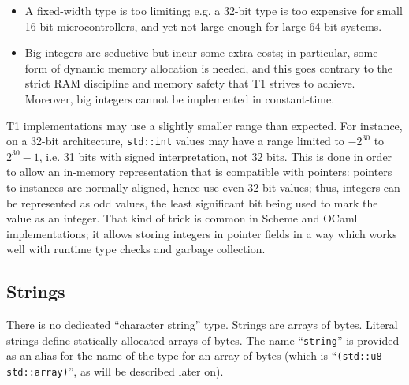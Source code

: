\begin{rationale}
\begin{itemize}
    \item A fixed-width type is too limiting; e.g. a 32-bit type is
    too expensive for small 16-bit microcontrollers, and yet not large
    enough for large 64-bit systems.

    \item Big integers are seductive but incur some extra costs; in
    particular, some form of dynamic memory allocation is needed, and
    this goes contrary to the strict RAM discipline and memory safety
    that T1 strives to achieve. Moreover, big integers cannot be
    implemented in constant-time.

\end{itemize}

T1 implementations may use a slightly smaller range than expected. For
instance, on a 32-bit architecture, \verb|std::int| values may have a
range limited to $-2^{30}$ to $2^{30}-1$, i.e. 31 bits with signed
interpretation, not 32 bits. This is done in order to allow an in-memory
representation that is compatible with pointers: pointers to instances
are normally aligned, hence use even 32-bit values; thus, integers can
be represented as odd values, the least significant bit being used to
mark the value as an integer. That kind of trick is common in Scheme and
OCaml implementations; it allows storing integers in pointer fields in a
way which works well with runtime type checks and garbage collection.
\end{rationale}

\subsection{Strings}

There is no dedicated ``character string'' type. Strings are arrays of
bytes. Literal strings define statically allocated arrays of bytes. The
name ``\verb|string|'' is provided as an alias for the name of the type
for an array of bytes (which is ``\verb|(std::u8 std::array)|'', as
will be described later on).

